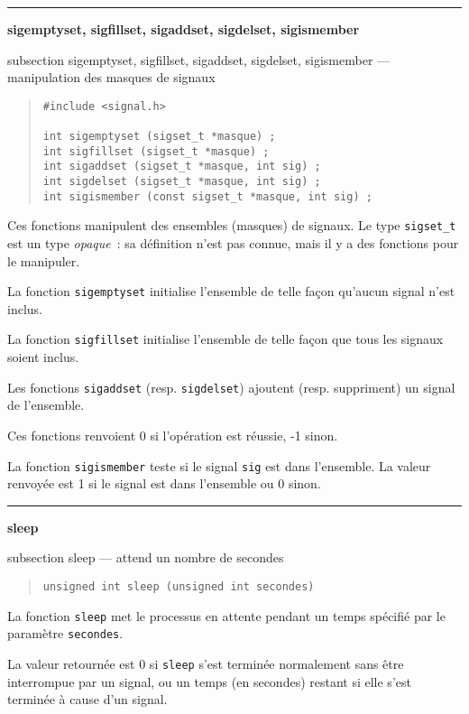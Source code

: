 \documentclass [twoside] {report}
\newcommand {\primitive} [1]
    {
	\phantomsection
	{\large \bf #1}
	\addcontentsline {toc} {subsection} {#1}
    }
\newcommand {\separation}
    {
	\vspace {5mm}
	\nopagebreak
	\hrule
    }
\begin{document}
\separation 
\primitive {sigemptyset, sigfillset, sigaddset, sigdelset, sigismember} ---
manipulation des masques de signaux
    \label {sigsetopts}

\begin {quote}
\begin {verbatim}
#include <signal.h>

int sigemptyset (sigset_t *masque) ;
int sigfillset (sigset_t *masque) ;
int sigaddset (sigset_t *masque, int sig) ;
int sigdelset (sigset_t *masque, int sig) ;
int sigismember (const sigset_t *masque, int sig) ;
\end{verbatim}
\end {quote}

Ces fonctions manipulent des ensembles (masques) de signaux.  Le type
{\tt sigset\_t} est un type {\em opaque}~:  sa définition n'est pas
connue, mais il y a des fonctions pour le manipuler.

La fonction {\tt sigemptyset} initialise l'ensemble de telle façon
qu'aucun signal n'est inclus.

La fonction {\tt sigfillset} initialise l'ensemble de telle façon que
tous les signaux soient inclus.

Les fonctions {\tt sigaddset} (resp. {\tt sigdelset}) ajoutent
(resp. suppriment) un signal de l'ensemble.

Ces fonctions renvoient 0 si l'opération est réussie, -1 sinon.

La fonction {\tt sigismember} teste si le signal {\tt sig} est dans
l'ensemble. La valeur renvoyée est 1 si le signal est dans l'ensemble
ou 0 sinon.



\separation 
\primitive {sleep} --- attend un nombre de secondes

\begin {quote}
\begin {verbatim}
unsigned int sleep (unsigned int secondes)
\end{verbatim}
\end {quote}

La fonction {\tt sleep} met le processus en attente pendant un temps
spécifié par le paramètre {\tt secondes}.

La valeur retournée est 0 si {\tt sleep} s'est terminée normalement sans
être interrompue par un signal, ou un temps (en secondes) restant
si elle s'est terminée à cause d'un signal.
\end{document}

